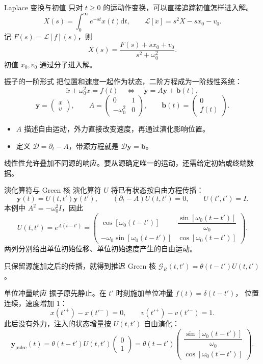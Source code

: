 \documentclass[aspectratio=169,11pt]{beamer}
\newcommand{\dd}{\mathrm d}
\begin{document}
\begin{frame}{Laplace 变换与初值}
只对 $t\ge0$ 的运动作变换，可以直接追踪初值怎样进入解。
\[
X(s)=\int_0^\infty e^{-st}x(t)\dd t,\qquad
\mathcal L[\ddot x]=s^2X-sx_0-v_0.
\]
记 $F(s)=\mathcal L[f](s)$，则
\[
X(s)=\frac{F(s)+sx_0+v_0}{s^2+\omega_0^2}.
\]
初值 $x_0,v_0$ 通过分子进入解。
\end{frame}

\begin{frame}{振子的一阶形式}
把位置和速度一起作为状态，二阶方程成为一阶线性系统：
\[
\ddot x+\omega_0^2x=f(t)
\quad\Longleftrightarrow\quad
\dot{\bm y}=A\bm y+\bm b(t),
\]
\[
\bm y=\begin{pmatrix}x\\v\end{pmatrix},\qquad
A=\begin{pmatrix}0&1\\-\omega_0^2&0\end{pmatrix},\qquad
\bm b(t)=\begin{pmatrix}0\\f(t)\end{pmatrix}.
\]
\begin{itemize}
\item $A$ 描述自由运动，外力直接改变速度，再通过演化影响位置。
\item 定义 $\mathcal D=\partial_t-A$，带源方程就是 $\mathcal D\bm y=\bm b$。
\end{itemize}
线性性允许叠加不同源的响应。要从源确定唯一的运动，还需给定初始或终端数据。
\end{frame}

\begin{frame}{演化算符与 Green 核}
演化算符 $U$ 将已有状态按自由方程传播：
\[
\bm y(t)=U(t,t')\bm y(t'),\qquad
(\partial_t-A)U(t,t')=0,\qquad U(t',t')=I.
\]
本例中 $A^2=-\omega_0^2I$，因此
\[
U(t,t')=e^{A(t-t')}
=\begin{pmatrix}
\cos[\omega_0(t-t')] & \dfrac{\sin[\omega_0(t-t')]}{\omega_0}\\[0.5em]
-\omega_0\sin[\omega_0(t-t')] & \cos[\omega_0(t-t')]
\end{pmatrix}.
\]
两列分别给出单位初始位移、单位初始速度产生的自由运动。
\medskip

只保留源施加之后的传播，就得到推迟 Green 核
$\mathcal G_R(t,t')=\theta(t-t')U(t,t')$。
\end{frame}

\begin{frame}{单位冲量响应}
振子原先静止。在 $t'$ 时刻施加单位冲量 $f(t)=\delta(t-t')$，
位置连续，速度增加 $1$：
\[
x(t'^+)-x(t'^-)=0,\qquad v(t'^+)-v(t'^-)=1.
\]
此后没有外力，注入的状态增量按 $U(t,t')$ 自由演化：
\[
\bm y_{\mathrm{pulse}}(t)
=\theta(t-t')U(t,t')\begin{pmatrix}0\\1\end{pmatrix}
=\theta(t-t')\begin{pmatrix}
\dfrac{\sin[\omega_0(t-t')]}{\omega_0}\\[0.5em]
\cos[\omega_0(t-t')]
\end{pmatrix}.
\]
\end{frame}
\end{document}
